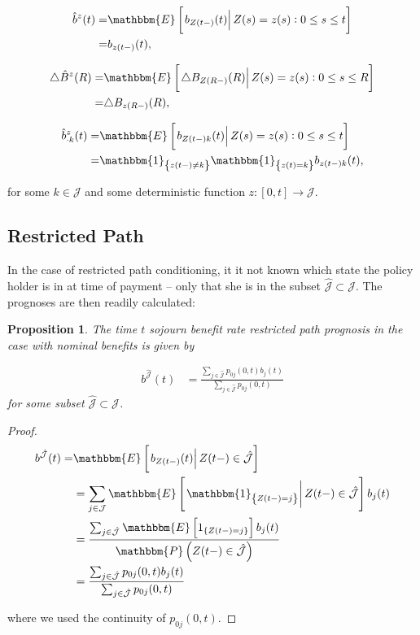 \documentclass{article}
\newcommand{\1}[1]{\mathbbm{1}_{\left\lbrace #1 \right\rbrace}}
\newcommand{\expec}[1][def]{\mathbbm{E} \left[ #1 \right]}
\newcommand{\econd}[2][def]{\mathbbm{E} \left[ \left. #1 \right| #2 \right]}
\newcommand{\probability}[1][def]{\mathbbm{P} \left( #1 \right)}
\theoremstyle{break}
\newtheorem{proposition}[definition]{Proposition}%
\theoremstyle{remark}
\numberwithin{equation}{section}
\begin{document}
\begin{align*}
	\hat{b}^z(t) =& \econd[b_{Z(t-)}(t)]{Z(s) = z(s) : 0 \leq s \leq t} \\
	=& b_{z(t-)}(t),
\end{align*}

\begin{align*}
	\triangle \hat{B}^z(R) =& \econd[\triangle B_{Z(R-)}(R)]{Z(s) = z(s) : 0 \leq s \leq R} \\
	=& \triangle B_{z(R-)}(R),
\end{align*}

\begin{align*}
	\hat{b}_{\cdot k}^z(t) =& \econd[b_{Z(t-)k}(t)]{ Z(s) = z(s) : 0 \leq s \leq t}\\
	=& \1{z(t-) \neq k} \1{z(t) = k} b_{z(t-) k}(t),
\end{align*}

for some $k \in \mathcal{J}$ and some deterministic function $z: [0,t] \to \mathcal{J}$.

\subsection{Restricted Path}

In the case of restricted path conditioning, it it not known which state the policy holder is in at time of payment -- only that she is in the subset $\hat{\mathcal{J}} \subset \mathcal{J}$. The prognoses are then readily calculated:

\begin{proposition} \label{SojournWithoutBonus}
The time $t$ sojourn benefit rate restricted path prognosis in the case with nominal benefits is given by

\begin{align*}
    b^{\hat{\mathcal{J}}}(t)
    &= \frac{\sum_{j \in \hat{\mathcal{J}}} p_{0j}(0,t) b_j(t)}{\sum_{j \in \hat{\mathcal{J}}} p_{0j}(0,t)}
\end{align*}
for some subset $\hat{\mathcal{J}} \subset \mathcal{J}$.
\end{proposition}

\begin{proof}
\begin{align*}
   	b^{\hat{\mathcal{J}}}(t) =& \econd[b_{Z(t-)}(t)]{Z(t-) \in \hat{\mathcal{J}}} \\
   	&= \sum_{j \in \mathcal{J}} \econd[\1{Z(t-)=j}]{Z(t-) \in \hat{\mathcal{J}}} b_j(t) \\
    &= \frac{\sum_{j \in \hat{\mathcal{J}}} \expec[ 1_{\{Z(t-)=j\}} ] b_j(t)}{\probability[Z(t-) \in \hat{\mathcal{J}}]} \\
    &= \frac{\sum_{j \in \hat{\mathcal{J}}} p_{0j}(0,t) b_j(t)}{\sum_{j \in \hat{\mathcal{J}}} p_{0j}(0,t)}
\end{align*}

where we used the continuity of $p_{0j}(0,t)$.
\end{proof}
\end{document}
